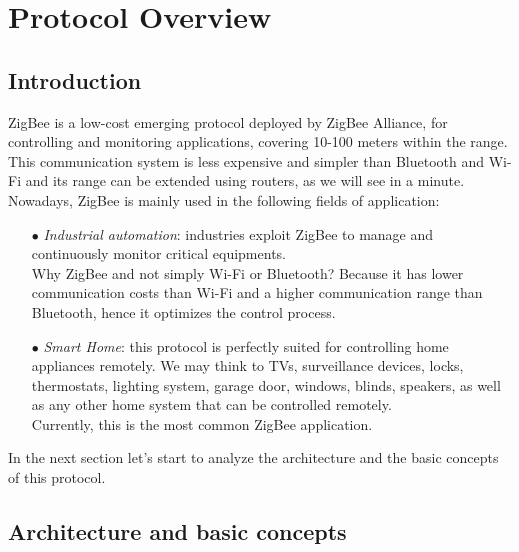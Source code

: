 \documentclass[12pt]{report}
\begin{document}
{{\chapter{Protocol Overview}

\section{Introduction}
\bigskip

ZigBee is a low-cost emerging protocol deployed by ZigBee Alliance, for controlling and monitoring applications, covering 10-100 meters within the range. \\
This communication system is less expensive and simpler than Bluetooth and Wi-Fi and its range can be extended using routers, as we will see in a minute.\\

Nowadays, ZigBee is mainly used in the following fields of application:
\begin{itemize}
\setlength{\itemindent}{+4mm}
\item[$\bullet$] \emph{Industrial automation}: industries exploit ZigBee to manage and continuously monitor critical equipments.\\
Why ZigBee and not simply Wi-Fi or Bluetooth? Because it has lower communication costs than Wi-Fi and a higher communication range than Bluetooth, hence it optimizes the control process.
\item[$\bullet$] \emph{Smart Home}: this protocol is perfectly suited for controlling home appliances remotely. We may think to TVs, surveillance devices, locks, thermostats, lighting system, garage door, windows, blinds, speakers, as well as any other home system that can be controlled remotely.\\
Currently, this is the most common ZigBee application.\\

\end{itemize}

In the next section let's start to analyze the architecture and the basic concepts of this protocol.\\

\section{Architecture and basic concepts}
\bigskip

}}
\end{document}
